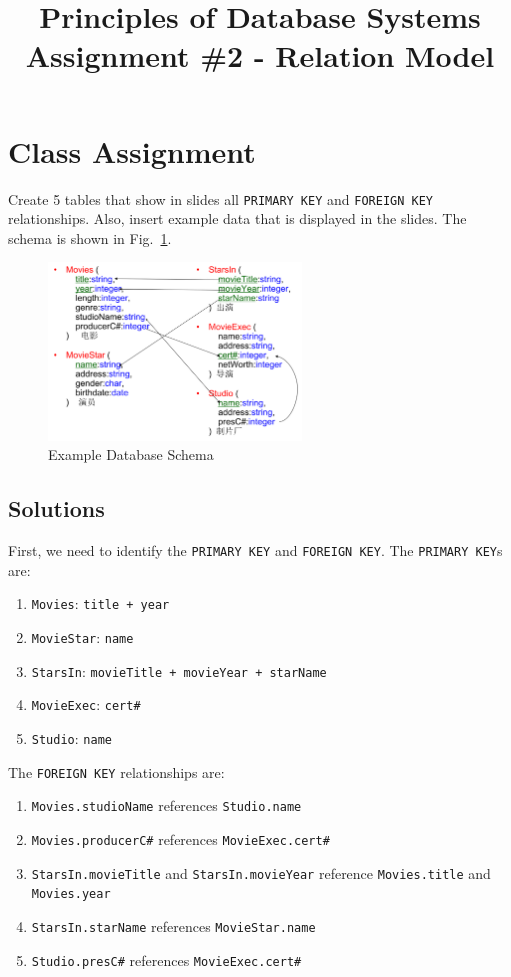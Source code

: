 \documentclass{cshwk}
\title{Principles of Database Systems\\Assignment \#2 - Relation Model}
\begin{document}
\maketitle

\section{Class Assignment}

Create 5 tables that show in slides all \texttt{PRIMARY KEY} and \texttt{FOREIGN KEY} relationships. Also, insert example data that is displayed in the slides. The schema is shown in Fig.~\ref{fig:schema}.

\begin{figure}[H]
    \centering
    \includegraphics[width=0.6\textwidth]{hw2-2.png}
    \caption{Example Database Schema}
    \label{fig:schema}
\end{figure}

\subsection*{Solutions}

First, we need to identify the \texttt{PRIMARY KEY} and \texttt{FOREIGN KEY}. The \texttt{PRIMARY KEY}s are:
\begin{enumerate}
    \item \texttt{Movies}: \texttt{title + year}
    \item \texttt{MovieStar}: \texttt{name}
    \item \texttt{StarsIn}: \texttt{movieTitle + movieYear + starName}
    \item \texttt{MovieExec}: \texttt{cert\#}
    \item \texttt{Studio}: \texttt{name}
\end{enumerate}

\noindent The \texttt{FOREIGN KEY} relationships are:
\begin{enumerate}
    \item \texttt{Movies.studioName} references \texttt{Studio.name}
    \item \texttt{Movies.producerC\#} references \texttt{MovieExec.cert\#}
    \item \texttt{StarsIn.movieTitle} and \texttt{StarsIn.movieYear} reference \texttt{Movies.title} and \texttt{Movies.year}
    \item \texttt{StarsIn.starName} references \texttt{MovieStar.name}
    \item \texttt{Studio.presC\#} references \texttt{MovieExec.cert\#}
\end{enumerate}
\end{document}
